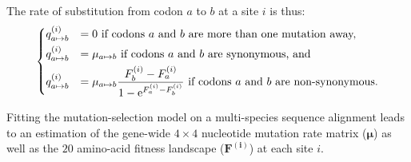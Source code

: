 \documentclass{article}
\newcommand{\UniDimArray}[1]{\bm{#1}}
\newcommand{\e}{\text{e}}
\begin{document}
    The rate of substitution from codon $a$ to $b$ at a site $i$ is thus:
    \begin{equation}
        \begin{dcases}
            q_{a \mapsto b}^{(i)} & = 0 \text{ if codons $a$ and $b$ are more than one mutation away,} \\
            q_{a \mapsto b}^{(i)} & = \mu_{a \mapsto b} \text{ if codons $a$ and $b$ are synonymous, and}\\
            q_{a \mapsto b}^{(i)} & = \mu_{a \mapsto b} \dfrac{F_b^{(i)} - F_a^{(i)}}{1 - \e^{F_a^{(i)} - F_b^{(i)}}} \text{ if codons $a$ and $b$ are non-synonymous}.
        \end{dcases}
    \end{equation}

    Fitting the mutation-selection model on a multi-species sequence alignment leads to an estimation of the gene-wide $4 \times 4$ nucleotide mutation rate matrix ($\UniDimArray{\mu}$) as well as the $20$ amino-acid fitness landscape ($\UniDimArray{F^{(i)}}$) at each site $i$.
\end{document}
